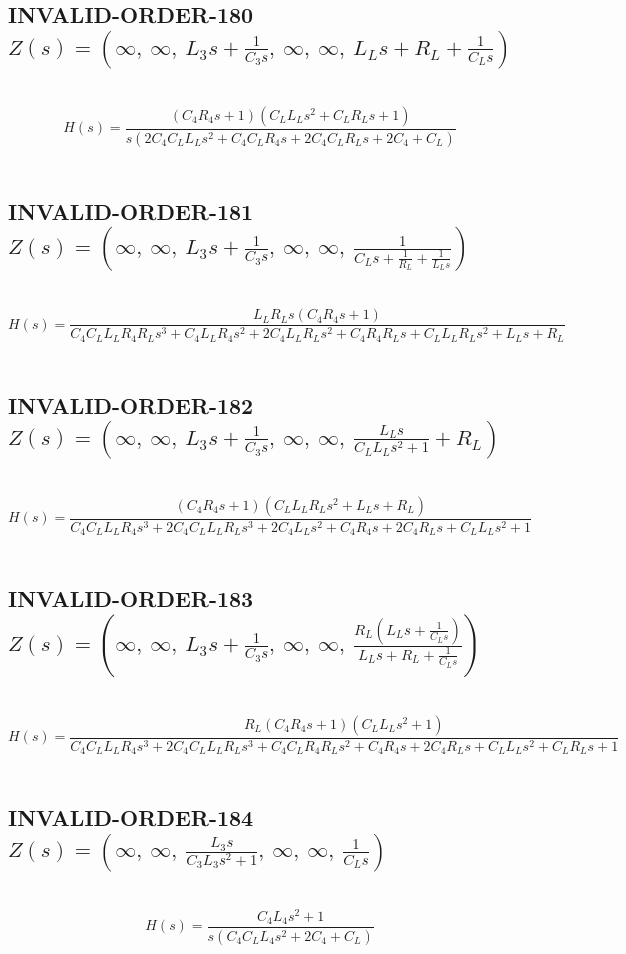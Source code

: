 \documentclass{article}
\begin{document}
\subsection{INVALID-ORDER-180 $Z(s) = \left( \infty, \  \infty, \  L_{3} s + \frac{1}{C_{3} s}, \  \infty, \  \infty, \  L_{L} s + R_{L} + \frac{1}{C_{L} s}\right)$ } \ 
\textbf{\[H(s) = \frac{\left(C_{4} R_{4} s + 1\right) \left(C_{L} L_{L} s^{2} + C_{L} R_{L} s + 1\right)}{s \left(2 C_{4} C_{L} L_{L} s^{2} + C_{4} C_{L} R_{4} s + 2 C_{4} C_{L} R_{L} s + 2 C_{4} + C_{L}\right)}\] } \ 
\subsection{INVALID-ORDER-181 $Z(s) = \left( \infty, \  \infty, \  L_{3} s + \frac{1}{C_{3} s}, \  \infty, \  \infty, \  \frac{1}{C_{L} s + \frac{1}{R_{L}} + \frac{1}{L_{L} s}}\right)$ } \ 
\textbf{\[H(s) = \frac{L_{L} R_{L} s \left(C_{4} R_{4} s + 1\right)}{C_{4} C_{L} L_{L} R_{4} R_{L} s^{3} + C_{4} L_{L} R_{4} s^{2} + 2 C_{4} L_{L} R_{L} s^{2} + C_{4} R_{4} R_{L} s + C_{L} L_{L} R_{L} s^{2} + L_{L} s + R_{L}}\] } \ 
\subsection{INVALID-ORDER-182 $Z(s) = \left( \infty, \  \infty, \  L_{3} s + \frac{1}{C_{3} s}, \  \infty, \  \infty, \  \frac{L_{L} s}{C_{L} L_{L} s^{2} + 1} + R_{L}\right)$ } \ 
\textbf{\[H(s) = \frac{\left(C_{4} R_{4} s + 1\right) \left(C_{L} L_{L} R_{L} s^{2} + L_{L} s + R_{L}\right)}{C_{4} C_{L} L_{L} R_{4} s^{3} + 2 C_{4} C_{L} L_{L} R_{L} s^{3} + 2 C_{4} L_{L} s^{2} + C_{4} R_{4} s + 2 C_{4} R_{L} s + C_{L} L_{L} s^{2} + 1}\] } \ 
\subsection{INVALID-ORDER-183 $Z(s) = \left( \infty, \  \infty, \  L_{3} s + \frac{1}{C_{3} s}, \  \infty, \  \infty, \  \frac{R_{L} \left(L_{L} s + \frac{1}{C_{L} s}\right)}{L_{L} s + R_{L} + \frac{1}{C_{L} s}}\right)$ } \ 
\textbf{\[H(s) = \frac{R_{L} \left(C_{4} R_{4} s + 1\right) \left(C_{L} L_{L} s^{2} + 1\right)}{C_{4} C_{L} L_{L} R_{4} s^{3} + 2 C_{4} C_{L} L_{L} R_{L} s^{3} + C_{4} C_{L} R_{4} R_{L} s^{2} + C_{4} R_{4} s + 2 C_{4} R_{L} s + C_{L} L_{L} s^{2} + C_{L} R_{L} s + 1}\] } \ 
\subsection{INVALID-ORDER-184 $Z(s) = \left( \infty, \  \infty, \  \frac{L_{3} s}{C_{3} L_{3} s^{2} + 1}, \  \infty, \  \infty, \  \frac{1}{C_{L} s}\right)$ } \ 
\textbf{\[H(s) = \frac{C_{4} L_{4} s^{2} + 1}{s \left(C_{4} C_{L} L_{4} s^{2} + 2 C_{4} + C_{L}\right)}\] } \ 
\end{document}
